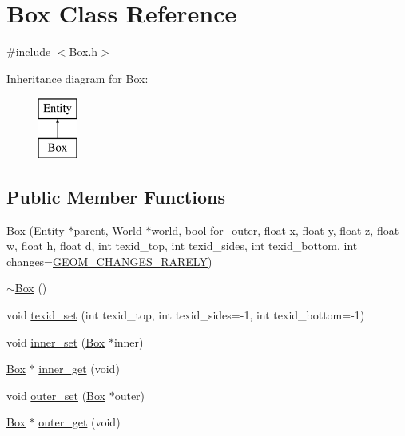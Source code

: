 \hypertarget{classBox}{}\section{Box Class Reference}
\label{classBox}


{\ttfamily \#include $<$Box.\+h$>$}

Inheritance diagram for Box\+:\begin{figure}[H]
\begin{center}
\leavevmode
\includegraphics[height=2.000000cm]{classBox}
\end{center}
\end{figure}
\subsection*{Public Member Functions}
\begin{DoxyCompactItemize}
\item 
\mbox{\hyperlink{classBox_aca29db382f87c7af916cc9114809ef05}{Box}} (\mbox{\hyperlink{classEntity}{Entity}} $\ast$parent, \mbox{\hyperlink{classWorld}{World}} $\ast$world, bool for\+\_\+outer, float x, float y, float z, float w, float h, float d, int texid\+\_\+top, int texid\+\_\+sides, int texid\+\_\+bottom, int changes=\mbox{\hyperlink{World_8h_adf764cbdea00d65edcd07bb9953ad2b7afd62cb9ff74dd66a2597e9c31e205cba}{G\+E\+O\+M\+\_\+\+C\+H\+A\+N\+G\+E\+S\+\_\+\+R\+A\+R\+E\+LY}})
\item 
\mbox{\hyperlink{classBox_a6a5e09398e85d602a046b429062fb9c2}{$\sim$\+Box}} ()
\item 
void \mbox{\hyperlink{classBox_a2a980195f8a6f341bb17c099b2f886ac}{texid\+\_\+set}} (int texid\+\_\+top, int texid\+\_\+sides=-\/1, int texid\+\_\+bottom=-\/1)
\item 
void \mbox{\hyperlink{classBox_ad2c07980042476c14d1ed072ff7fe6ef}{inner\+\_\+set}} (\mbox{\hyperlink{classBox}{Box}} $\ast$inner)
\item 
\mbox{\hyperlink{classBox}{Box}} $\ast$ \mbox{\hyperlink{classBox_a4c90479b80ff40afefefd7b65696ca25}{inner\+\_\+get}} (void)
\item 
void \mbox{\hyperlink{classBox_a58ddc8fee18ace5fac0ee445e8011881}{outer\+\_\+set}} (\mbox{\hyperlink{classBox}{Box}} $\ast$outer)
\item 
\mbox{\hyperlink{classBox}{Box}} $\ast$ \mbox{\hyperlink{classBox_ac4510baf549bd4801a09e4c2541f761d}{outer\+\_\+get}} (void)
\end{DoxyCompactItemize}
